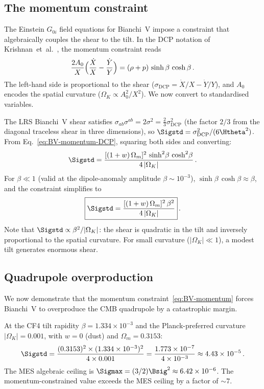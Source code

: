 \subsection{The momentum constraint}\label{sec:BV-momentum}

The Einstein $G_{0i}$ field equations for Bianchi~V impose a
constraint that algebraically couples the shear to the tilt.
In the DCP notation of
Krishnan~et~al.~\cite{Krishnan2022,Krishnan2023}, the
momentum constraint reads
\begin{equation}\label{eq:BV-momentum-DCP}
\frac{2A_0}{X}\Bigl(\frac{\dot{X}}{X}
  - \frac{\dot{Y}}{Y}\Bigr)
= (\rho + p)\,\sinh\beta\,\cosh\beta\,.
\end{equation}
The left-hand side is proportional to the shear
($\sigma_{\mathrm{DCP}} = \dot{X}/X - \dot{Y}/Y$), and
$A_0$ encodes the spatial curvature ($\Omega_K \propto
A_0^2/X^2$).  We now convert to standardised variables.

The LRS Bianchi~V shear satisfies
$\sigma_{ab}\sigma^{ab} = 2\sigma^2 = \frac{2}{3}\sigma_{\mathrm{DCP}}^2$
(the factor $2/3$ from the diagonal traceless shear in three
dimensions), so $\Sigstd = \sigma_{\mathrm{DCP}}^2/(6\Htheta^2)$.
From Eq.~\eqref{eq:BV-momentum-DCP}, squaring both sides and
converting:
\begin{equation}\label{eq:BV-Sig2-exact}
\Sigstd
= \frac{[(1+w)\,\Omega_m]^2\,\sinh^2\!\beta\,\cosh^2\!\beta}
       {4\,|\Omega_K|}\,.
\end{equation}
For $\beta \ll 1$ (valid at the dipole-anomaly amplitude
$\beta \sim 10^{-3}$), $\sinh\beta\,\cosh\beta \approx \beta$,
and the constraint simplifies to
\begin{equation}\label{eq:BV-momentum}
\boxed{
\Sigstd
= \frac{[(1+w)\,\Omega_m]^2\,\beta^2}{4\,|\Omega_K|}
}\,.
\end{equation}
Note that $\Sigstd \propto \beta^2/|\Omega_K|$: the shear is
quadratic in the tilt and inversely proportional to the spatial
curvature.  For small curvature ($|\Omega_K| \ll 1$), a modest
tilt generates enormous shear.


\subsection{Quadrupole overproduction}\label{sec:BV-quad}

We now demonstrate that the momentum
constraint~\eqref{eq:BV-momentum} forces Bianchi~V to
overproduce the CMB quadrupole by a catastrophic margin.

At the CF4 tilt rapidity $\beta = 1.334 \times 10^{-3}$
and the Planck-preferred curvature
$|\Omega_K| = 0.001$, with $w = 0$ (dust) and
$\Omega_m = 0.3153$:
\begin{equation}\label{eq:BV-Sig2-num}
\Sigstd
= \frac{(0.3153)^2 \times (1.334 \times 10^{-3})^2}
       {4 \times 0.001}
= \frac{1.773 \times 10^{-7}}{4 \times 10^{-3}}
\approx 4.43 \times 10^{-5}\,.
\end{equation}
The MES algebraic ceiling is
$\Sigmax = (3/2)\Bsig^2 \approx 6.42 \times
10^{-6}$.  The momentum-constrained value exceeds the MES
ceiling by a factor of $\sim 7$.

